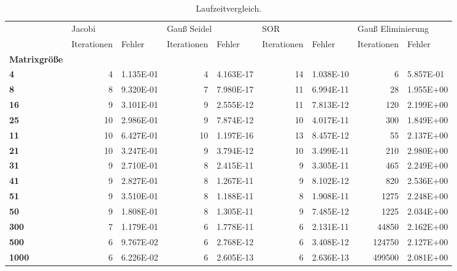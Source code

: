 \begin{table}[h!]
\centering
\caption{Laufzeitvergleich.}
\label{laufzeit}
\begin{tabular}{lrlrlrlrl}
\toprule
{} & \multicolumn{2}{l}{Jacobi} & \multicolumn{2}{l}{Gauß Seidel} & \multicolumn{2}{l}{SOR} & \multicolumn{2}{l}{Gauß Eliminierung} \\
{} & Iterationen &     Fehler & Iterationen &     Fehler & Iterationen &     Fehler &       Iterationen &     Fehler \\
\textbf{Matrixgröße} &             &            &             &            &             &            &                   &            \\
\midrule
\textbf{4          } &           4 &  1.135E-01 &           4 &  4.163E-17 &          14 &  1.038E-10 &                 6 &  5.857E-01 \\
\textbf{8          } &           8 &  9.320E-01 &           7 &  7.980E-17 &          11 &  6.994E-11 &                28 &  1.955E+00 \\
\textbf{16         } &           9 &  3.101E-01 &           9 &  2.555E-12 &          11 &  7.813E-12 &               120 &  2.199E+00 \\
\textbf{25         } &          10 &  2.986E-01 &           9 &  7.874E-12 &          10 &  4.017E-11 &               300 &  1.849E+00 \\
\textbf{11         } &          10 &  6.427E-01 &          10 &  1.197E-16 &          13 &  8.457E-12 &                55 &  2.137E+00 \\
\textbf{21         } &          10 &  3.247E-01 &           9 &  3.794E-12 &          10 &  3.499E-11 &               210 &  2.980E+00 \\
\textbf{31         } &           9 &  2.710E-01 &           8 &  2.415E-11 &           9 &  3.305E-11 &               465 &  2.249E+00 \\
\textbf{41         } &           9 &  2.827E-01 &           8 &  1.267E-11 &           9 &  8.102E-12 &               820 &  2.536E+00 \\
\textbf{51         } &           9 &  3.510E-01 &           8 &  1.188E-11 &           8 &  1.908E-11 &              1275 &  2.248E+00 \\
\textbf{50         } &           9 &  1.808E-01 &           8 &  1.305E-11 &           9 &  7.485E-12 &              1225 &  2.034E+00 \\
\textbf{300        } &           7 &  1.179E-01 &           6 &  1.778E-11 &           6 &  2.131E-11 &             44850 &  2.162E+00 \\
\textbf{500        } &           6 &  9.767E-02 &           6 &  2.768E-12 &           6 &  3.408E-12 &            124750 &  2.127E+00 \\
\textbf{1000       } &           6 &  6.226E-02 &           6 &  2.605E-13 &           6 &  2.636E-13 &            499500 &  2.081E+00 \\
\bottomrule
\end{tabular}
\end{table}
